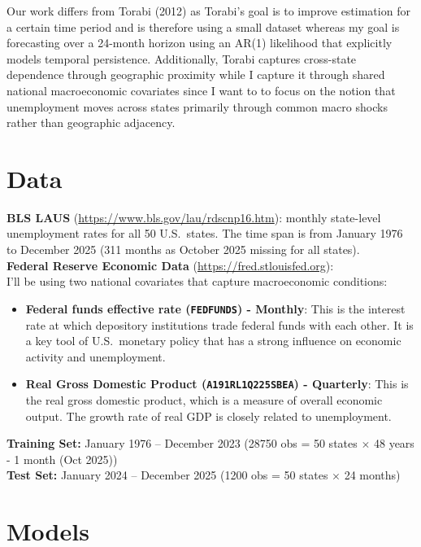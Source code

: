 \documentclass[10pt]{article}
\begin{document}
Our work differs from Torabi (2012) as Torabi's goal is to improve estimation for a certain time period and is therefore using a small dataset
whereas my goal is forecasting over a 24-month horizon using
an AR(1) likelihood that explicitly models temporal persistence. Additionally, Torabi captures cross-state dependence through geographic proximity
while I capture it through shared national macroeconomic covariates
since I want to to focus on the notion that unemployment
moves across states primarily through common macro shocks rather than
geographic adjacency.

\section{Data} 

\textbf{BLS LAUS} (\url{https://www.bls.gov/lau/rdscnp16.htm}):
monthly state-level unemployment rates for all 50 U.S.\ states. The time span is from
January 1976 to December 2025 (311 months as October 2025 missing for all states). \\

\textbf{Federal Reserve Economic Data} (\url{https://fred.stlouisfed.org}): \\ 
I'll be using two national covariates that capture macroeconomic conditions:
\begin{itemize}[noitemsep]
  \item \textbf{Federal funds effective rate (\texttt{FEDFUNDS}) - Monthly}: This is the interest rate at which depository institutions trade federal funds with each other. It is a key tool of U.S.\ monetary policy that has a strong influence on economic activity and unemployment.
  \item \textbf{Real Gross Domestic Product (\texttt{A191RL1Q225SBEA}) - Quarterly}: This is the real gross domestic product, which is a measure of overall economic output. The growth rate of real GDP is closely related to unemployment. \\ 
\end{itemize} 
\textbf{Training Set:} January 1976 -- December 2023 (28750 obs = 50 states $\times$ 48 years - 1 month (Oct 2025)) \\
\textbf{Test Set:} January 2024 -- December 2025 (1200 obs = 50 states $\times$ 24 months)
\section{Models}
\end{document}
